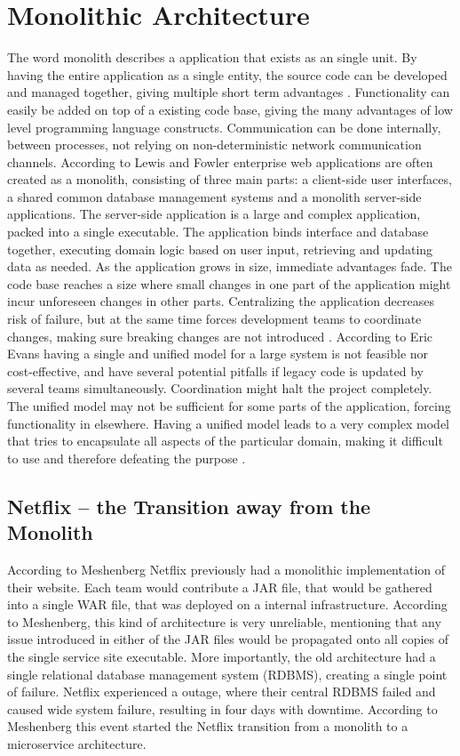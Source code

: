 \section{Monolithic Architecture}
The word monolith describes a application that exists as an single unit. By having the entire application as a single entity, the source code can be developed and managed together, giving multiple short term advantages \cite[p.~68]{long2017cloud}. Functionality can easily be added on top of a existing code base, giving the many advantages of low level programming language constructs. Communication can be done internally, between processes, not relying on non-deterministic network communication channels. 
According to Lewis and Fowler\cite{fowler2014microservices} enterprise web applications are often created as a monolith, consisting of three main parts: a client-side user interfaces, a shared common database management systems and a monolith server-side applications. The server-side application is a large and complex application, packed into a single executable. The application binds interface and database together, executing domain logic based on user input, retrieving and updating data as needed.
As the application grows in size, immediate advantages fade. The code base reaches a size where small changes in one part of the application might incur unforeseen changes in other parts. Centralizing the application decreases risk of failure, but at the same time forces development teams to coordinate changes, making sure breaking changes are not introduced \cite[p.~68]{long2017cloud}. 
According to Eric Evans having a single and unified model for a large system is not feasible nor cost-effective, and have several potential pitfalls if legacy code is updated by several teams simultaneously. Coordination might halt the project completely. The unified model may not be sufficient for some parts of the application, forcing functionality in elsewhere. Having a unified model leads to a very complex model that tries to encapsulate all aspects of the particular domain, making it difficult to use and therefore defeating the purpose \cite[p.~331]{evans2004domain}.

\subsection{Netflix -- the Transition away from the Monolith}
According to Meshenberg \cite{meshenberg2016microservices} Netflix previously had a monolithic implementation of their website. Each team would contribute a JAR file, that would be gathered into a single WAR file, that was deployed on a internal infrastructure. According to Meshenberg, this kind of architecture is very unreliable, mentioning that any issue introduced in either of the JAR files would be propagated onto all copies of the single service site executable. More importantly, the old architecture had a single relational database management system (RDBMS), creating a single point of failure\cite{meshenberg2016microservices}. Netflix experienced a outage, where their central RDBMS failed and caused wide system failure, resulting in four days with downtime. According to Meshenberg this event started the Netflix transition from a monolith to a microservice architecture.


